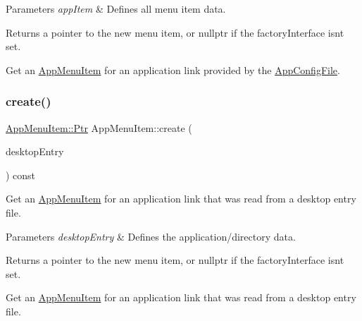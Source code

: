 \begin{DoxyParams}{Parameters}
{\em app\+Item} & Defines all menu item data.\\
\hline
\end{DoxyParams}
\begin{DoxyReturn}{Returns}
a pointer to the new menu item, or nullptr if the factory\+Interface isn\textquotesingle{}t set.
\end{DoxyReturn}
Get an \mbox{\hyperlink{classAppMenuItem}{App\+Menu\+Item}} for an application link provided by the \mbox{\hyperlink{classAppConfigFile}{App\+Config\+File}}. \mbox{\label{classAppMenuItem_a624ea6d7559bc01ae14273280467bbdb}} 
\subsubsection{\texorpdfstring{create()}{create()}\hspace{0.1cm}{\footnotesize\ttfamily [2/3]}}
{\footnotesize\ttfamily \mbox{\hyperlink{classAppMenuItem_ab5f51c5d74f8df62b8862c0cc8126cb7}{App\+Menu\+Item\+::\+Ptr}} App\+Menu\+Item\+::create (\begin{DoxyParamCaption}\item[{const \mbox{\hyperlink{classDesktopEntry}{Desktop\+Entry}} \&}]{desktop\+Entry }\end{DoxyParamCaption}) const\hspace{0.3cm}{\ttfamily [protected]}}

Get an \mbox{\hyperlink{classAppMenuItem}{App\+Menu\+Item}} for an application link that was read from a desktop entry file.


\begin{DoxyParams}{Parameters}
{\em desktop\+Entry} & Defines the application/directory data.\\
\hline
\end{DoxyParams}
\begin{DoxyReturn}{Returns}
a pointer to the new menu item, or nullptr if the factory\+Interface isn\textquotesingle{}t set.
\end{DoxyReturn}
Get an \mbox{\hyperlink{classAppMenuItem}{App\+Menu\+Item}} for an application link that was read from a desktop entry file. \mbox{\label{classAppMenuItem_a7dad9c79d8c97f93b04670f638469c67}} 
